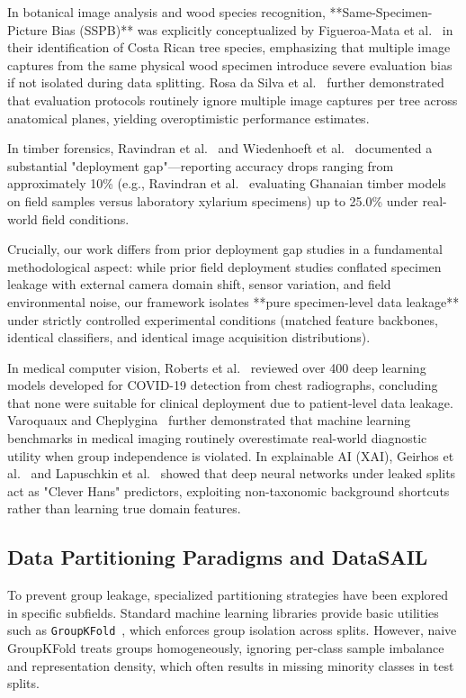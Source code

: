 In botanical image analysis and wood species recognition, **Same-Specimen-Picture Bias (SSPB)** was explicitly conceptualized by Figueroa-Mata et al.~\cite{figueroamata2022} in their identification of Costa Rican tree species, emphasizing that multiple image captures from the same physical wood specimen introduce severe evaluation bias if not isolated during data splitting. Rosa da Silva et al.~\cite{rosadasilva2022} further demonstrated that evaluation protocols routinely ignore multiple image captures per tree across anatomical planes, yielding overoptimistic performance estimates.

In timber forensics, Ravindran et al.~\cite{ravindran2019,ravindran2020,ravindran2021,ravindran2022} and Wiedenhoeft et al.~\cite{wiedenhoeft2011} documented a substantial "deployment gap"---reporting accuracy drops ranging from approximately 10\% (e.g., Ravindran et al.~\cite{ravindran2019} evaluating Ghanaian timber models on field samples versus laboratory xylarium specimens) up to 25.0\% under real-world field conditions.

Crucially, our work differs from prior deployment gap studies in a fundamental methodological aspect: while prior field deployment studies conflated specimen leakage with external camera domain shift, sensor variation, and field environmental noise, our framework isolates **pure specimen-level data leakage** under strictly controlled experimental conditions (matched feature backbones, identical classifiers, and identical image acquisition distributions).

In medical computer vision, Roberts et al.~\cite{roberts2021} reviewed over 400 deep learning models developed for COVID-19 detection from chest radiographs, concluding that none were suitable for clinical deployment due to patient-level data leakage. Varoquaux and Cheplygina~\cite{varoquaux2022} further demonstrated that machine learning benchmarks in medical imaging routinely overestimate real-world diagnostic utility when group independence is violated. In explainable AI (XAI), Geirhos et al.~\cite{geirhos2020} and Lapuschkin et al.~\cite{lapuschkin2019} showed that deep neural networks under leaked splits act as "Clever Hans" predictors, exploiting non-taxonomic background shortcuts rather than learning true domain features.

\subsection{Data Partitioning Paradigms and DataSAIL}
To prevent group leakage, specialized partitioning strategies have been explored in specific subfields. Standard machine learning libraries provide basic utilities such as \texttt{GroupKFold}~\cite{scikit}, which enforces group isolation across splits. However, naive GroupKFold treats groups homogeneously, ignoring per-class sample imbalance and representation density, which often results in missing minority classes in test splits.

